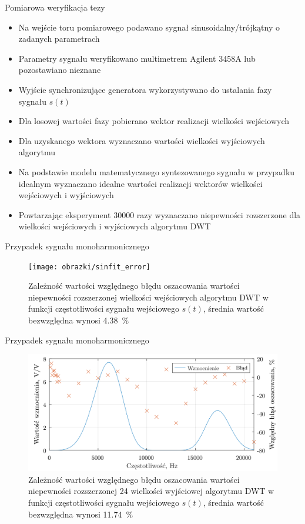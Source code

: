 \documentclass[12pt, polish, aspectratio = 169]{beamer}
\begin{document}
\begin{frame}{Pomiarowa weryfikacja tezy}
\begin{itemize}
\item Na wejście toru pomiarowego podawano sygnał sinusoidalny/trójkątny o zadanych parametrach
\item Parametry sygnału weryfikowano multimetrem Agilent 3458A lub pozostawiano nieznane
\item Wyjście synchronizujące generatora wykorzystywano do ustalania fazy sygnału $s(t)$
\item Dla losowej wartości fazy pobierano wektor realizacji wielkości wejściowych
\item Dla uzyskanego wektora wyznaczano wartości wielkości wyjściowych algorytmu
\item Na podstawie modelu matematycznego syntezowanego sygnału w przypadku idealnym wyznaczano idealne wartości realizacji wektorów wielkości wejściowych i wyjściowych
\item Powtarzając eksperyment \num{30000} razy wyznaczano niepewności rozszerzone dla wielkości wejściowych i wyjściowych algorytmu DWT
\end{itemize}
\end{frame}

\begin{frame}{Przypadek sygnału monoharmonicznego}
\begin{figure}
\begin{center}
\texttt{[image: obrazki/sinfit\_error]}
\caption{Zależność wartości względnego błędu oszacowania wartości niepewności rozszerzonej wielkości wejściowych algorytmu DWT w funkcji częstotliwości sygnału wejściowego $s(t)$, średnia wartość bezwzględna wynosi \qty{4.38}{\percent}}
\label{fig:sinfit_error}
\end{center}
\end{figure}
\end{frame}

\begin{frame}{Przypadek sygnału monoharmonicznego}
\begin{figure}
\begin{center}
\includegraphics[scale = 0.75]{obrazki/mono_freqcomp}
\caption{Zależność wartości względnego błędu oszacowania wartości niepewności rozszerzonej \qty{24}{\numTej} wielkości wyjściowej algorytmu DWT w funkcji częstotliwości sygnału wejściowego $s(t)$, średnia wartość bezwzględna wynosi \qty{11.74}{\percent}}
\label{fig:mono_freqcomp}
\end{center}
\end{figure}
\end{frame}
\end{document}
